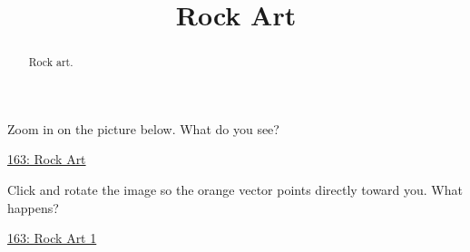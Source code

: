 \documentclass{ximera}
\title{Rock Art}
\begin{document}
\begin{abstract}
Rock art.
\end{abstract}
\maketitle



\begin{exploration}
Zoom in on the picture below. What do you see?
\begin{onlineOnly}
    \begin{center}
\end{center}
\end{onlineOnly}

\href{https://www.desmos.com/calculator/awoec8d6pq}{163: Rock Art}
\end{exploration}


\begin{exploration}
Click and rotate the image so the orange vector points directly toward you. What happens?
\begin{onlineOnly}
    \begin{center}
\end{center}
\end{onlineOnly}

\href{https://www.desmos.com/3d/9g2timus2m}{163: Rock Art 1}
\end{exploration}
\end{document}
